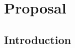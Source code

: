 
\chapter{Proposal} %

\label{Proposal} %

\newcommand{\keyword}[1]{\textbf{\#1}}
\newcommand{\tabhead}[1]{\textbf{\#1}}
\newcommand{\code}[1]{\texttt{\#1}}
\newcommand{\file}[1]{\texttt{\bfseries\#1}}
\newcommand{\option}[1]{\texttt{\itshape\#1}}


\section{Introduction}



